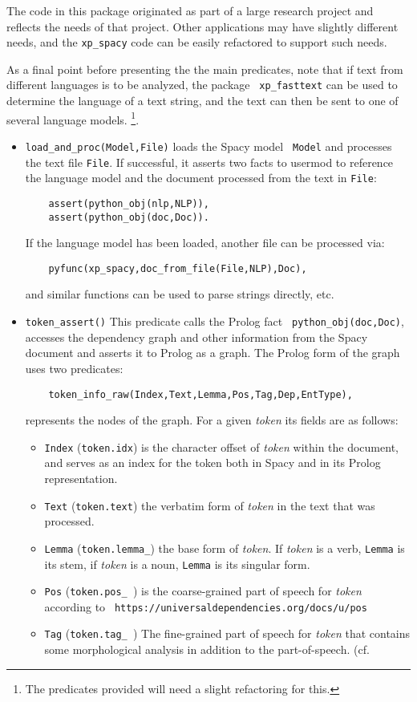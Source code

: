 The code in this package originated as part of a large research
project and reflects the needs of that project.  Other applications
may have slightly different needs, and the {\tt xp\_spacy} code can be
easily refactored to support such needs.

As a final point before presenting the the main predicates, note that
if text from different languages is to be analyzed, the package {\tt
  xp\_fasttext} can be used to determine the language of a text
string, and the text can then be sent to one of several language
models. \footnote{The predicates provided will need a slight
  refactoring for this.}.

\begin{itemize}
\item {\tt load\_and\_proc(Model,File)} loads the Spacy model {\tt
  Model} and processes the text file {\tt File}.  If successful, it
  asserts two facts to usermod to reference the language model and the
  document processed from the text in {\tt File}:
\begin{verbatim}  
    assert(python_obj(nlp,NLP)),
    assert(python_obj(doc,Doc)).
\end{verbatim}

If the language model has been loaded, another file can be processed via:
\begin{verbatim}
    pyfunc(xp_spacy,doc_from_file(File,NLP),Doc),                              
\end{verbatim}
and similar functions can be used to parse strings directly, etc.

\item {\tt token\_assert()} This predicate calls the Prolog fact {\tt
  python\_obj(doc,Doc)}, accesses the dependency graph and other
  information from the Spacy document and asserts it to Prolog as a
  graph.  The Prolog form of the graph uses two predicates:
\begin{verbatim}  
    token_info_raw(Index,Text,Lemma,Pos,Tag,Dep,EntType),
\end{verbatim}
represents the nodes of the graph.  For a given {\em token} its fields
are as follows:
\begin{itemize}
  \item {\tt Index} ({\tt token.idx}) is the character offset of {\em
    token} within the document, and serves as an index for the token
    both in Spacy and in its Prolog representation.
  \item {\tt Text} ({\tt token.text}) the verbatim form of {\em token}
    in the text that was processed.
  \item {\tt Lemma} ({\tt token.lemma\_}) the base form of {\em
    token}.  If {\em token} is a verb, {\tt Lemma} is its stem, if
    {\em token} is a noun, {\tt Lemma} is its singular form.
  \item {\tt Pos} ({\tt token.pos\_ }) is the coarse-grained part of
    speech for {\em token} according to {\tt
      https://universaldependencies.org/docs/u/pos}
  \item {\tt Tag} ({\tt token.tag\_ }) The fine-grained part of speech
    for {\em token} that contains some morphological analysis in
    addition to the part-of-speech.
    (cf.


\end{itemize}
\end{itemize}
